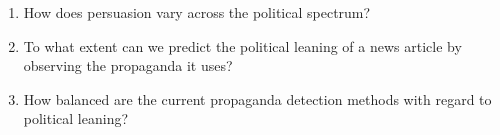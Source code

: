 \begin{enumerate}[label={\textbf{RQ3.\arabic*:}},leftmargin=2cm]
    \item How does persuasion vary across the political spectrum?
    \item To what extent can we predict the political leaning of a news article by observing the propaganda it uses?
    \item How balanced are the current propaganda detection methods with regard to political leaning?
\end{enumerate}



